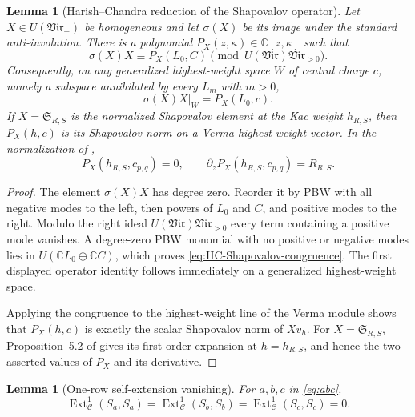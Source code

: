 \documentclass[12pt,leqno]{amsart}
\numberwithin{equation}{section}
\newtheorem{lem}[thm]{Lemma}
\newcommand{\Ext}{\operatorname{Ext}}
\newcommand{\Vir}{\mathfrak{Vir}}
\def\C{\mathbb{C}}
\begin{document}
\begin{lem}[Harish--Chandra reduction of the Shapovalov operator]
\label{lem:Shapovalov-HC-reduction}
Let $X\in U(\Vir_-)$ be homogeneous and let $\sigma(X)$ be its image
under the standard anti-involution.  There is a polynomial
$P_X(z,\kappa)\in\C[z,\kappa]$ such that
\begin{equation}\label{eq:HC-Shapovalov-congruence}
 \sigma(X)X\equiv P_X(L_0,C)
 \pmod{U(\Vir)\Vir_{>0}}.
\end{equation}
Consequently, on any generalized highest-weight space $W$ of central
charge $c$, namely a subspace annihilated by every $L_m$ with $m>0$,
\[
 \left.\sigma(X)X\right|_W=P_X(L_0,c).
\]
If $X=\mathfrak S_{R,S}$ is the normalized Shapovalov element at the
Kac weight $h_{R,S}$, then $P_X(h,c)$ is its Shapovalov norm on a Verma
highest-weight vector.  In the normalization of
\cite[Proposition~5.2]{Nakano},
\[
 P_X(h_{R,S},c_{p,q})=0,\qquad
 \partial_zP_X(h_{R,S},c_{p,q})=R_{R,S}.
\]
\end{lem}

\begin{proof}
The element $\sigma(X)X$ has degree zero.  Reorder it by PBW with all
negative modes to the left, then powers of $L_0$ and $C$, and positive
modes to the right.  Modulo the right ideal
$U(\Vir)\Vir_{>0}$ every term containing a positive mode vanishes.  A
degree-zero PBW monomial with no positive or negative modes lies in
$U(\C L_0\oplus\C C)$, which proves
\eqref{eq:HC-Shapovalov-congruence}.  The first displayed operator
identity follows immediately on a generalized highest-weight space.

Applying the congruence to the highest-weight line of the Verma module
shows that $P_X(h,c)$ is exactly the scalar Shapovalov norm of $Xv_h$.
For $X=\mathfrak S_{R,S}$, Proposition~5.2 of \cite{Nakano} gives its
first-order expansion at $h=h_{R,S}$, and hence the two asserted values
of $P_X$ and its derivative.
\end{proof}

\begin{lem}[One-row self-extension vanishing]
\label{lem:one-row-self-Ext}
For $a,b,c$ in \eqref{eq:abc},
\[
 \Ext^1_{\mathscr C}(S_a,S_a)=
 \Ext^1_{\mathscr C}(S_b,S_b)=
 \Ext^1_{\mathscr C}(S_c,S_c)=0.
\]
\end{lem}
\end{document}
